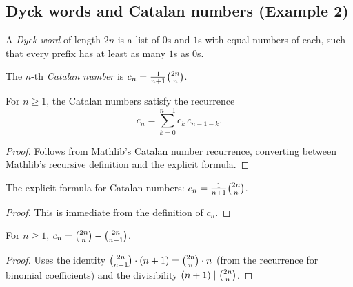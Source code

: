 \subsection{Dyck words and Catalan numbers (Example 2)}

\begin{definition}
\label{def.catalan.dyck}
\leanhelper
\leanok
A \emph{Dyck word} of length $2n$ is a list of $0$s and $1$s
with equal numbers of each, such that every prefix has at least as many $1$s as $0$s.
\end{definition}

\begin{definition}
\label{def.catalan.catalan}
\leanhelper
\leanok
The $n$-th \emph{Catalan number} is $c_n = \frac{1}{n+1}\dbinom{2n}{n}$.
\end{definition}

\begin{theorem}
\label{thm.catalan.recurrence}
\leanhelper
\leanok
For $n \geq 1$, the Catalan numbers satisfy the recurrence
\[
c_n = \sum_{k=0}^{n-1} c_k \, c_{n-1-k}.
\]
\end{theorem}

\begin{proof}
\leanok
Follows from Mathlib's Catalan number recurrence, converting between
Mathlib's recursive definition and the explicit formula.
\end{proof}

\begin{lemma}
\label{lem.catalan.explicit}
\leanhelper
\leanok
The explicit formula for Catalan numbers:
$c_n = \frac{1}{n+1}\dbinom{2n}{n}$.
\end{lemma}

\begin{proof}
\leanok
This is immediate from the definition of $c_n$.
\end{proof}

\begin{lemma}
\label{lem.catalan.as_diff}
\leanhelper
\leanok
For $n \geq 1$,
$c_n = \dbinom{2n}{n} - \dbinom{2n}{n-1}$.
\end{lemma}

\begin{proof}
\leanok
Uses the identity $\dbinom{2n}{n-1}\cdot(n+1) = \dbinom{2n}{n}\cdot n$
(from the recurrence for binomial coefficients) and the divisibility $(n+1) \mid \dbinom{2n}{n}$.
\end{proof}

